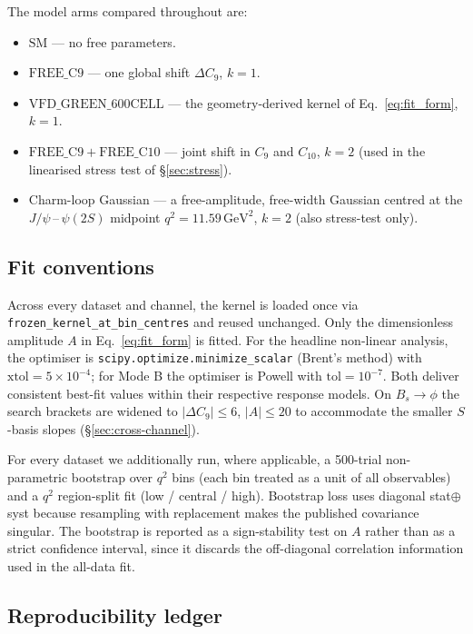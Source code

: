 The model arms compared throughout are:
\begin{itemize}
\item $\mathrm{SM}$ — no free parameters.
\item $\mathrm{FREE\_C9}$ — one global shift $\Delta C_{9}$, $k=1$.
\item $\mathrm{VFD\_GREEN\_600CELL}$ — the geometry-derived kernel of
  Eq.~\eqref{eq:fit_form}, $k=1$.
\item $\mathrm{FREE\_C9\!+\!FREE\_C10}$ — joint shift in $C_{9}$ and
  $C_{10}$, $k=2$ (used in the linearised stress test of
  \S\ref{sec:stress}).
\item Charm-loop Gaussian — a free-amplitude, free-width Gaussian
  centred at the $J/\psi$\,--\,$\psi(2S)$ midpoint
  $q^{2}=11.59\,\mathrm{GeV}^{2}$, $k=2$ (also stress-test only).
\end{itemize}

\subsection{Fit conventions}

Across every dataset and channel, the kernel is loaded once via
\texttt{frozen\_kernel\_at\_bin\_centres} and reused unchanged. Only
the dimensionless amplitude $A$ in Eq.~\eqref{eq:fit_form} is fitted.
For the headline non-linear analysis, the optimiser is
\texttt{scipy.optimize.minimize\_scalar} (Brent's method) with
$\mathrm{xtol}=5\times 10^{-4}$; for Mode B the optimiser is Powell
with $\mathrm{tol}=10^{-7}$. Both deliver consistent best-fit values
within their respective response models. On $B_{s}\to\phi$ the search
brackets are widened to $|\Delta C_{9}|\leq 6$, $|A|\leq 20$ to
accommodate the smaller $S$-basis slopes
(\S\ref{sec:cross-channel}).

For every dataset we additionally run, where applicable, a 500-trial
non-parametric bootstrap over $q^{2}$ bins (each bin treated as a unit
of all observables) and a $q^{2}$ region-split fit (low / central /
high). Bootstrap loss uses diagonal stat$\oplus$syst because resampling
with replacement makes the published covariance singular. The
bootstrap is reported as a sign-stability test on $A$ rather than as a
strict confidence interval, since it discards the off-diagonal
correlation information used in the all-data fit.

\subsection{Reproducibility ledger}


